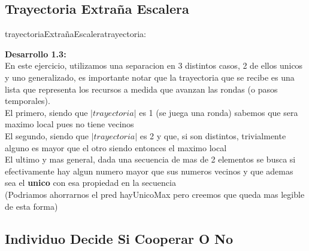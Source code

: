 \documentclass[10pt,a4paper]{article}
\begin{document}
\subsection{Trayectoria Extraña Escalera}

\begin{proc}{trayectoriaExtrañaEscalera}{\In trayectoria: \TLista{\float}}{\bool}
    
	

\textbf{Desarrollo 1.3:}
\\
En este ejercicio, utilizamos una separacion en 3 distintos casos, 2 de ellos unicos y uno generalizado, es importante notar que la trayectoria que se recibe es una lista que representa los recursos a medida que avanzan las rondas (o pasos temporales).
\\ El primero, siendo que $|\textit{trayectoria}|$ es 1 (se juega una ronda) sabemos que sera maximo local pues no tiene vecinos
\\ El segundo, siendo que $|\textit{trayectoria}|$ es 2 y que, si son distintos, trivialmente alguno es mayor que el otro siendo entonces el maximo local
\\El ultimo y mas general, dada una secuencia de mas de 2 elementos se busca si efectivamente hay algun numero mayor que sus numeros vecinos y que ademas sea el \textbf{unico} con esa propiedad en la secuencia
\\ (Podriamos ahorrarnos el pred hayUnicoMax pero creemos que queda mas legible de esta forma)
\end{proc}

\subsection{Individuo Decide Si Cooperar O No}
\end{document}
